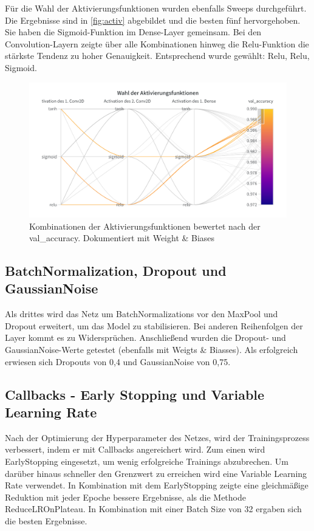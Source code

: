 \documentclass[
fontsize=12pt,					%
paper=a4,						%
twoside=false, 					%
listof=totoc, 					%
bibliography=totoc,				%
titlepage, 						%
headsepline, 					%
DIV=12,							%
BCOR=6mm,						%
cleardoublepage=empty,			%
parskip,							%
ngerman
]{scrartcl}
\begin{document}
Für die Wahl der Aktivierungsfunktionen wurden ebenfalls Sweeps durchgeführt. Die Ergebnisse sind in \autoref{fig:activ} abgebildet und die besten fünf hervorgehoben. Sie haben die Sigmoid-Funktion im Dense-Layer gemeinsam. Bei den Convolution-Layern zeigte über alle Kombinationen hinweg die Relu-Funktion die stärkste Tendenz zu hoher Genauigkeit. Entsprechend wurde gewählt: Relu, Relu, Sigmoid.

\begin{figure}[h]
	\centering
	\includegraphics[width=0.7\linewidth]{images/Activ}
	\caption{Kombinationen der Aktivierungsfunktionen bewertet nach der val\_accuracy. Dokumentiert mit Weight \& Biases}
	\label{fig:activ}
\end{figure}

\subsection{BatchNormalization, Dropout und GaussianNoise}

Als drittes wird das Netz um BatchNormalizations vor den MaxPool und Dropout erweitert, um das Model zu stabilisieren. Bei anderen Reihenfolgen der Layer kommt es zu Widersprüchen. \autocite{Li.2018}\autocite{Cai.2020} Anschließend wurden die Dropout- und GaussianNoise-Werte getestet (ebenfalls mit Weigts \& Biasses). Als erfolgreich erwiesen sich Dropouts von 0,4 und GaussianNoise von 0,75.	

\subsection{Callbacks - Early Stopping und Variable Learning Rate}

Nach der Optimierung der Hyperparameter des Netzes, wird der Trainingsprozess verbessert, indem er mit Callbacks angereichert wird. Zum einen wird EarlyStopping eingesetzt, um wenig erfolgreiche Trainings abzubrechen. Um darüber hinaus schneller den Grenzwert zu erreichen wird eine Variable Learning Rate verwendet. In Kombination mit dem EarlyStopping zeigte eine gleichmäßige Reduktion mit jeder Epoche bessere Ergebnisse, als die Methode ReduceLROnPlateau. In Kombination mit einer Batch Size von 32 ergaben sich die besten Ergebnisse.
\end{document}
